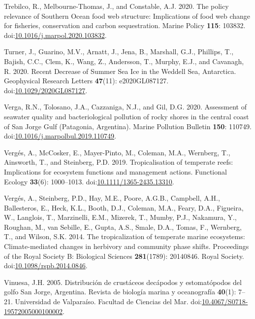 \documentclass[
]{article}
\newlength{\cslhangindent}
\newenvironment{CSLReferences}[2] %
 {\begin{list}{}{%
  \setlength{\itemindent}{0pt}
  \setlength{\leftmargin}{0pt}
  \setlength{\parsep}{0pt}
  \ifodd #1
   \setlength{\leftmargin}{\cslhangindent}
   \setlength{\itemindent}{-1\cslhangindent}
  \fi
  \setlength{\itemsep}{#2\baselineskip}}}
 {\end{list}}
\begin{document}
\begin{CSLReferences}{1}{0}
Trebilco, R., Melbourne-Thomas, J., and Constable, A.J. 2020. The policy
relevance of {Southern Ocean} food web structure: {Implications} of food
web change for fisheries, conservation and carbon sequestration. Marine
Policy \textbf{115}: 103832.
doi:\href{https://doi.org/10.1016/j.marpol.2020.103832}{10.1016/j.marpol.2020.103832}.

Turner, J., Guarino, M.V., Arnatt, J., Jena, B., Marshall, G.J.,
Phillips, T., Bajish, C.C., Clem, K., Wang, Z., Andersson, T., Murphy,
E.J., and Cavanagh, R. 2020. Recent {Decrease} of {Summer Sea Ice} in
the {Weddell Sea}, {Antarctica}. Geophysical Research Letters
\textbf{47}(11): e2020GL087127.
doi:\href{https://doi.org/10.1029/2020GL087127}{10.1029/2020GL087127}.

Verga, R.N., Tolosano, J.A., Cazzaniga, N.J., and Gil, D.G. 2020.
Assessment of seawater quality and bacteriological pollution of rocky
shores in the central coast of {San Jorge Gulf} ({Patagonia},
{Argentina}). Marine Pollution Bulletin \textbf{150}: 110749.
doi:\href{https://doi.org/10.1016/j.marpolbul.2019.110749}{10.1016/j.marpolbul.2019.110749}.

Vergés, A., McCosker, E., Mayer-Pinto, M., Coleman, M.A., Wernberg, T.,
Ainsworth, T., and Steinberg, P.D. 2019. Tropicalisation of temperate
reefs: {Implications} for ecosystem functions and management actions.
Functional Ecology \textbf{33}(6): 1000--1013.
doi:\href{https://doi.org/10.1111/1365-2435.13310}{10.1111/1365-2435.13310}.

Vergés, A., Steinberg, P.D., Hay, M.E., Poore, A.G.B., Campbell, A.H.,
Ballesteros, E., Heck, K.L., Booth, D.J., Coleman, M.A., Feary, D.A.,
Figueira, W., Langlois, T., Marzinelli, E.M., Mizerek, T., Mumby, P.J.,
Nakamura, Y., Roughan, M., van Sebille, E., Gupta, A.S., Smale, D.A.,
Tomas, F., Wernberg, T., and Wilson, S.K. 2014. The tropicalization of
temperate marine ecosystems: Climate-mediated changes in herbivory and
community phase shifts. Proceedings of the Royal Society B: Biological
Sciences \textbf{281}(1789): 20140846. Royal Society.
doi:\href{https://doi.org/10.1098/rspb.2014.0846}{10.1098/rspb.2014.0846}.

Vinuesa, J.H. 2005. Distribuci{ó}n de crust{á}ceos dec{á}podos y
estomat{ó}podos del golfo {San Jorge}, {Argentina}. Revista de
biolog{í}a marina y oceanograf{í}a \textbf{40}(1): 7--21. Universidad de
Valpara{í}so. Facultad de Ciencias del Mar.
doi:\href{https://doi.org/10.4067/S0718-19572005000100002}{10.4067/S0718-19572005000100002}.


\end{CSLReferences}
\end{document}
